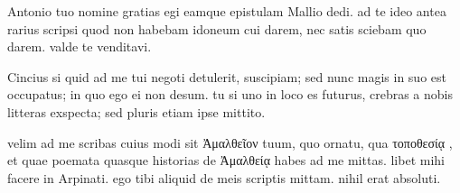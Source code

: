  Antonio tuo nomine gratias egi eamque epistulam Mallio dedi. ad te ideo antea rarius scripsi quod non habebam idoneum cui darem, nec satis sciebam quo darem. valde te venditavi.

 Cincius si quid ad me tui negoti detulerit, suscipiam; sed nunc magis in suo est occupatus; in quo ego ei non desum. tu si uno in loco es futurus, crebras a nobis litteras exspecta; sed pluris etiam ipse mittito.

 velim ad me scribas cuius modi sit Ἀμαλθεῖον tuum, quo ornatu, qua τοποθεσίᾳ , et quae poemata quasque historias de Ἀμαλθείᾳ habes ad me mittas. libet mihi facere in Arpinati. ego tibi aliquid de meis scriptis mittam. nihil erat absoluti.
